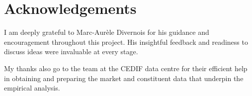 \chapter*{Acknowledgements}

I am deeply grateful to Marc-Aurèle Divernois for his guidance and encouragement throughout this project. His insightful feedback and readiness to discuss ideas were invaluable at every stage.

My thanks also go to the team at the CEDIF data centre for their efficient help in obtaining and preparing the market and constituent data that underpin the empirical analysis.